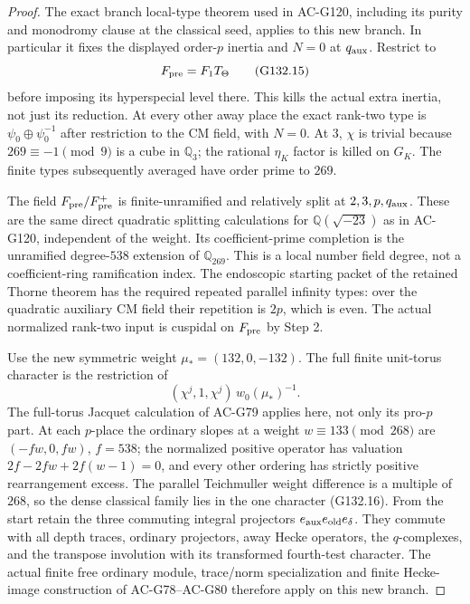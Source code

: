 \begin{proof}
The exact branch local-type theorem used in AC-G120, including
its purity and monodromy clause at the classical seed, applies
to this new branch.  In particular it fixes the displayed
order-\(p\) inertia and \(N=0\) at \(q_{\rm aux}\).
Restrict to
\[
                  F_{\rm pre}=F_1T_\Theta
 \tag{G132.15}
\]
before imposing its hyperspecial level there.  This kills the
actual extra inertia, not just its reduction.
At every other away place the exact rank-two type is
\(\psi_0\oplus\psi_0^{-1}\) after restriction to the CM
field, with \(N=0\).  At \(3\), \(\chi\) is trivial because
\(269\equiv-1\pmod9\) is a cube in \(\mathbb Q_3\);
the rational \(\eta_K\) factor is killed on \(G_K\).
The finite types subsequently averaged have order prime to
\(269\).

The field \(F_{\rm pre}/F_{\rm pre}^+\) is finite-unramified
and relatively split at \(2,3,p,q_{\rm aux}\).
These are the same direct quadratic splitting calculations for
\(\mathbb Q(\sqrt{-23})\) as in AC-G120, independent of the
weight.  Its coefficient-prime completion is the unramified
degree-\(538\) extension of \(\mathbb Q_{269}\).
This is a local number field degree, not a coefficient-ring
ramification index.
The endoscopic starting packet of the retained Thorne theorem
has the required repeated parallel infinity types: over the
quadratic auxiliary CM field their repetition is \(2p\),
which is even.  The actual normalized rank-two input is
cuspidal on \(F_{\rm pre}\) by Step 2.

Use the new symmetric weight
\(\mu_*=(132,0,-132)\).
The full finite unit-torus character is the restriction of
\[
        (\chi^j,1,\chi^j)\,w_0(\mu_*)^{-1}.
 \tag{G132.16}
\]
The full-torus Jacquet calculation of AC-G79 applies here,
not only its pro-\(p\) part.  At each \(p\)-place the ordinary
slopes at a weight \(w\equiv133\pmod{268}\) are
\((-fw,0,fw)\), \(f=538\); the normalized positive operator
has valuation
\(2f-2fw+2f(w-1)=0\), and every other ordering has strictly
positive rearrangement excess.  The parallel Teichmuller
weight difference is a multiple of \(268\), so the dense
classical family lies in the one character (G132.16).
From the start retain the three commuting integral projectors
\(e_{\rm aux}e_{\rm old}e_\delta\).
They commute with all depth traces, ordinary projectors,
away Hecke operators, the \(q\)-complexes, and the transpose
involution with its transformed fourth-test character.
The actual finite free ordinary module, trace/norm
specialization and finite Hecke-image construction of
AC-G78--AC-G80 therefore apply on this new branch.


\end{proof}
